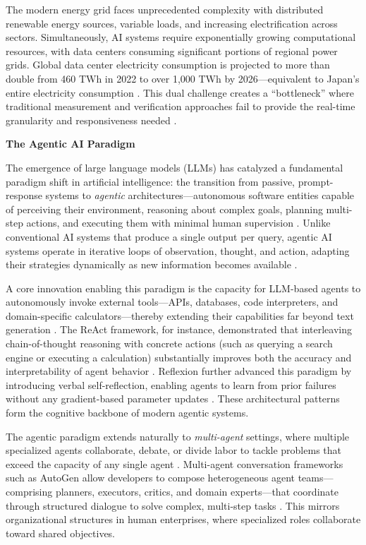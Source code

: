 \documentclass[11pt,a4paper]{article}
\begin{document}
\begin{itemize}
    The modern energy grid faces unprecedented complexity with distributed renewable energy sources, variable loads, and increasing electrification across sectors. Simultaneously, AI systems require exponentially growing computational resources, with data centers consuming significant portions of regional power grids. Global data center electricity consumption is projected to more than double from 460 TWh in 2022 to over 1,000 TWh by 2026—equivalent to Japan's entire electricity consumption \cite{iea2024electricity}. This dual challenge creates a ``bottleneck'' where traditional measurement and verification approaches fail to provide the real-time granularity and responsiveness needed \cite{aceee2024, nature2025ai}.

    \textbf{The Agentic AI Paradigm}

    The emergence of large language models (LLMs) has catalyzed a fundamental paradigm shift in artificial intelligence: the transition from passive, prompt-response systems to \textit{agentic} architectures—autonomous software entities capable of perceiving their environment, reasoning about complex goals, planning multi-step actions, and executing them with minimal human supervision \cite{wang2023agents, xi2023agents}. Unlike conventional AI systems that produce a single output per query, agentic AI systems operate in iterative loops of observation, thought, and action, adapting their strategies dynamically as new information becomes available \cite{yao2023react, shinn2023reflexion}.

    A core innovation enabling this paradigm is the capacity for LLM-based agents to autonomously invoke external tools—APIs, databases, code interpreters, and domain-specific calculators—thereby extending their capabilities far beyond text generation \cite{schick2023toolformer}. The ReAct framework, for instance, demonstrated that interleaving chain-of-thought reasoning with concrete actions (such as querying a search engine or executing a calculation) substantially improves both the accuracy and interpretability of agent behavior \cite{yao2023react}. Reflexion further advanced this paradigm by introducing verbal self-reflection, enabling agents to learn from prior failures without any gradient-based parameter updates \cite{shinn2023reflexion}. These architectural patterns form the cognitive backbone of modern agentic systems.

    The agentic paradigm extends naturally to \textit{multi-agent} settings, where multiple specialized agents collaborate, debate, or divide labor to tackle problems that exceed the capacity of any single agent \cite{wu2023autogen, guo2024multiagents}. Multi-agent conversation frameworks such as AutoGen allow developers to compose heterogeneous agent teams—comprising planners, executors, critics, and domain experts—that coordinate through structured dialogue to solve complex, multi-step tasks \cite{wu2023autogen}. This mirrors organizational structures in human enterprises, where specialized roles collaborate toward shared objectives.


\end{itemize}
\end{document}
